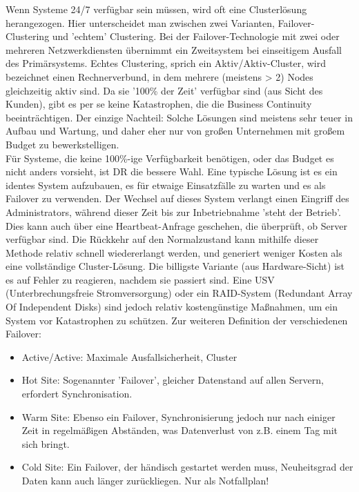 \documentclass[letterpaper, 12pt]{article}
\begin{document}
Wenn Systeme 24/7 verfügbar sein müssen, wird oft eine Clusterlösung herangezogen. Hier unterscheidet
man zwischen zwei Varianten, Failover-Clustering und ’echtem’ Clustering. Bei der
Failover-Technologie mit zwei oder mehreren Netzwerkdiensten übernimmt ein Zweitsystem bei
einseitigem Ausfall des Primärsystems. Echtes Clustering, sprich ein Aktiv/Aktiv-Cluster, wird
bezeichnet einen Rechnerverbund, in dem mehrere (meistens > 2) Nodes gleichzeitig aktiv sind. Da sie '100\% der Zeit' verfügbar sind (aus Sicht des Kunden), gibt es per se keine Katastrophen, die die Business Continuity beeinträchtigen. Der einzige Nachteil:
Solche Lösungen sind meistens sehr teuer in Aufbau und Wartung, und daher eher nur von
großen Unternehmen mit großem Budget zu bewerkstelligen. \\
Für Systeme, die keine 100\%-ige Verfügbarkeit benötigen, oder das Budget es nicht anders vorsieht,
ist DR die bessere Wahl. Eine typische Lösung ist es ein identes System aufzubauen, es für etwaige
Einsatzfälle zu warten und es als Failover zu verwenden. Der Wechsel auf dieses System verlangt
einen Eingriff des Administrators, während dieser Zeit bis zur Inbetriebnahme ’steht der Betrieb’. Dies kann auch über eine Heartbeat-Anfrage geschehen, die überprüft, ob Server verfügbar sind. 
Die Rückkehr auf den Normalzustand kann mithilfe dieser Methode relativ schnell wiedererlangt
werden, und generiert weniger Kosten als eine vollständige Cluster-Lösung. Die billigste Variante (aus Hardware-Sicht) ist es auf Fehler zu reagieren, nachdem sie passiert
sind. Eine USV (Unterbrechungsfreie Stromversorgung) oder ein RAID-System (Redundant Array Of Independent Disks) sind jedoch relativ kostengünstige Maßnahmen, um ein System vor Katastrophen zu schützen. Zur weiteren Definition der verschiedenen Failover: 
\begin{itemize}
	\item Active/Active: \newline Maximale Ausfallsicherheit, Cluster
	\item Hot Site: \newline Sogenannter 'Failover', gleicher Datenstand auf allen Servern, erfordert Synchronisation.
	\item Warm Site: \newline Ebenso ein Failover, Synchronisierung jedoch nur nach einiger Zeit in regelmäßigen Abständen, was Datenverlust von z.B. einem Tag mit sich bringt.
	\item Cold Site: Ein Failover, der händisch gestartet werden muss, Neuheitsgrad der Daten kann auch länger zurückliegen. Nur als Notfallplan! \cite{ausarbeitungdis}
\end{itemize}
\end{document}
